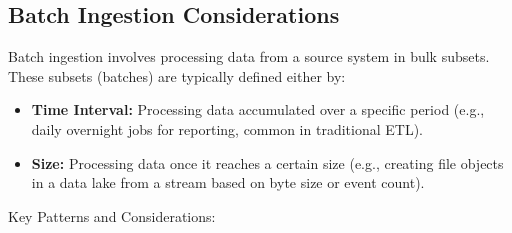 \subsection{Batch Ingestion Considerations}
Batch ingestion involves processing data from a source system in
bulk subsets. These subsets (batches) are typically defined either
by:
\begin{itemize}
    \item \textbf{Time Interval:} Processing data accumulated over
    a specific period (e.g., daily overnight jobs for reporting,
    common in traditional  ETL).

    \item \textbf{Size:} Processing data once it reaches a certain
    size (e.g., creating file objects in a data lake from a stream
    based on byte size or event count).
\end{itemize}

Key Patterns and Considerations:

